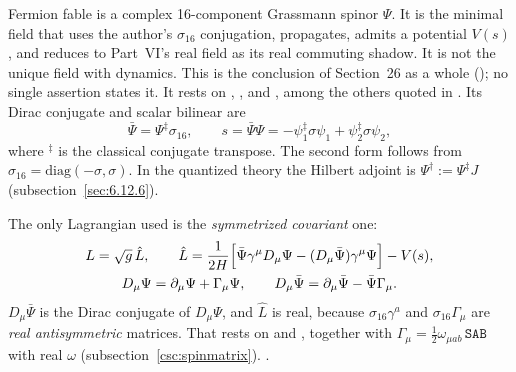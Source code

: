 Fermion fable is a complex 16-component Grassmann spinor $\Psi$. It is the minimal field that uses
the author's $\sigma_{16}$ conjugation, propagates, admits a potential $V(s)$, and reduces to
Part~VI's real field as its real commuting shadow. It is not the unique field with dynamics. This is
the conclusion of Section~26 as a whole (); no single assertion states it. It rests on
 , ,
 and , among the others quoted in . Its
Dirac conjugate and scalar bilinear are
\begin{equation}
  \bar\Psi=\Psi^{\ddagger}\sigma_{16},\qquad
  s=\bar\Psi\Psi=-\psi_1^{\ddagger}\sigma\psi_1+\psi_2^{\ddagger}\sigma\psi_2,
\end{equation}
where ${}^\ddagger$ is the classical conjugate transpose. The second form follows from
$\sigma_{16}=\mathrm{diag}(-\sigma,\sigma)$. In the quantized theory the Hilbert adjoint is
$\Psi^\dagger:=\Psi^\ddagger J$ (subsection~\ref{sec:6.12.6}).

The only Lagrangian used is the \emph{symmetrized covariant} one:
\begin{gather}
  L=\sqrt g\,\hat L,\qquad
  \hat L=\frac{1}{2H}\Bigl[\bar\Psi\gamma^\mu D_\mu\Psi-(D_\mu\bar\Psi)\gamma^\mu\Psi\Bigr]-V(s),\label{csc:eq:Lsym}\\
  D_\mu\Psi=\partial_\mu\Psi+\Gamma_\mu\Psi,\qquad
  D_\mu\bar\Psi=\partial_\mu\bar\Psi-\bar\Psi\Gamma_\mu .\notag
\end{gather}
$D_\mu\bar\Psi$ is the Dirac conjugate of $D_\mu\Psi$, and $\hat L$ is real, because
$\sigma_{16}\gamma^a$ and $\sigma_{16}\Gamma_\mu$ are \emph{real antisymmetric} matrices. That rests
on   and
, together with
$\Gamma_\mu=\tfrac12\omega_{\mu ab}\,\texttt{SAB}$ with real $\omega$
(subsection~\ref{csc:spinmatrix}).  .


